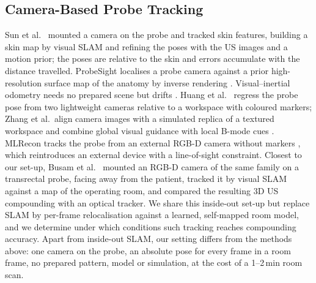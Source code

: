 \documentclass[journal]{IEEEtran}
\begin{document}
\subsection{Camera-Based Probe Tracking}
Sun et al.\ \cite{sun2014skin} mounted a camera on the probe and tracked skin features, building a skin map by visual SLAM and refining the poses with the US images and a motion prior; the poses are relative to the skin and errors accumulate with the distance travelled. ProbeSight localises a probe camera against a prior high-resolution surface map of the anatomy by inverse rendering \cite{wang2017probesight}. Visual--inertial odometry needs no prepared scene but drifts \cite{buchanan2024vio,he2024probemounted}. Huang et al.\ \cite{huang2025lightweight} regress the probe pose from two lightweight cameras relative to a workspace with coloured markers; Zhang et al.\ align camera images with a simulated replica of a textured workspace \cite{zhang2025servoing} and combine global visual guidance with local B-mode cues \cite{zhang2026seeing}. MLRecon tracks the probe from an external RGB-D camera without markers \cite{zhang2026mlrecon}, which reintroduces an external device with a line-of-sight constraint. Closest to our set-up, Busam et al.\ \cite{busam2018insideout} mounted an RGB-D camera of the same family on a transrectal probe, facing away from the patient, tracked it by visual SLAM against a map of the operating room, and compared the resulting 3D US compounding with an optical tracker. We share this inside-out set-up but replace SLAM by per-frame relocalisation against a learned, self-mapped room model, and we determine under which conditions such tracking reaches compounding accuracy. Apart from inside-out SLAM, our setting differs from the methods above: one camera on the probe, an absolute pose for every frame in a room frame, no prepared pattern, model or simulation, at the cost of a 1--2\,min room scan.
\end{document}
